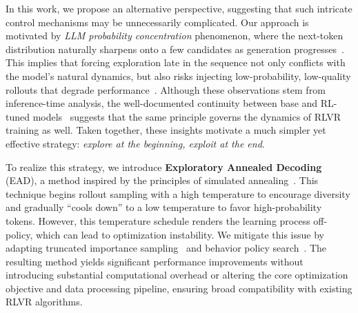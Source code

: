 \documentclass{article} %
\newcommand{\ych}[1]{\textcolor{purple}{[#1 -Chenghao]}}
\newcommand{\algname}{Exploratory Annealed Decoding\xspace}
\begin{document}
In this work, we propose an alternative perspective, suggesting that such intricate control mechanisms may be unnecessarily complicated.
%
Our approach is motivated by \textit{LLM probability concentration} phenomenon, where the next-token distribution naturally sharpens onto a few candidates as generation progresses~\citep{yang2025alignment}.
%
This implies that forcing exploration late in the sequence not only conflicts with the model's natural dynamics, but also risks injecting low-probability, low-quality rollouts that degrade performance~\citep{liao2025lost, yang2025alignment, fu2025deep}.
Although these observations stem from inference-time analysis, the well-documented continuity between base and RL-tuned models~\citep{yue2025does, zhao2025echo} suggests that the same principle governs the dynamics of RLVR training as well.
%
Taken together, these insights motivate a much simpler yet effective strategy: \textit{explore at the beginning, exploit at the end}.
%


To realize this strategy, we introduce \textbf{\algname} (EAD), a method inspired by the principles of simulated annealing~\citep{kirkpatrick1983optimization, bertsimas1993simulated}.
This technique begins rollout sampling with a high temperature to encourage diversity and gradually ``cools down'' to a low temperature to favor high-probability tokens.
However, this temperature schedule renders the learning process off-policy, which can lead to optimization instability.
We mitigate this issue by adapting truncated importance sampling~\citep{heckman1998matching} and behavior policy search~\citep{hanna2017data}.
The resulting method yields significant performance improvements without introducing substantial computational overhead or altering the core optimization objective and data processing pipeline, ensuring broad compatibility with existing RLVR algorithms.
\end{document}
